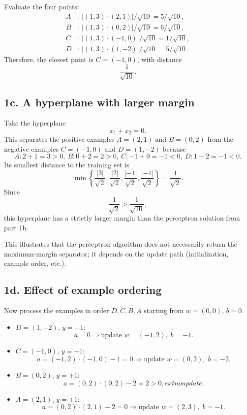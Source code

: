 \documentclass[11pt]{article}
\begin{document}
Evaluate the four points:
\[
\begin{aligned}
A &:~ |(1,3)\cdot(2,1)|/\sqrt{10} = 5/\sqrt{10},\\
B &:~ |(1,3)\cdot(0,2)|/\sqrt{10} = 6/\sqrt{10},\\
C &:~ |(1,3)\cdot(-1,0)|/\sqrt{10} = 1/\sqrt{10},\\
D &:~ |(1,3)\cdot(1,-2)|/\sqrt{10} = 5/\sqrt{10}.
\end{aligned}
\]
Therefore, the closest point is $C=(-1,0)$, with distance
\[
\boxed{\frac{1}{\sqrt{10}}.}
\]

\subsection*{1c. A hyperplane with larger margin}

Take the hyperplane
\[
x_1+x_2=0.
\]
This separates the positive examples $A=(2,1)$ and $B=(0,2)$ from the negative examples $C=(-1,0)$ and $D=(1,-2)$ because
\[
A: 2+1=3>0,\
B: 0+2=2>0,\
C: -1+0=-1<0,\
D: 1-2=-1<0.
\]
Its smallest distance to the training set is
\[
\min\left\{\frac{|3|}{\sqrt2},\frac{|2|}{\sqrt2},\frac{|-1|}{\sqrt2},\frac{|-1|}{\sqrt2}\right\} = \frac{1}{\sqrt2}.
\]
Since
\[
\frac{1}{\sqrt2} > \frac{1}{\sqrt{10}},
\]
this hyperplane has a strictly larger margin than the perceptron solution from part 1b.

This illustrates that the perceptron algorithm does not necessarily return the maximum-margin separator; it depends on the update path (initialization, example order, etc.).

\subsection*{1d. Effect of example ordering}

Now process the examples in order $D,C,B,A$ starting from $w=(0,0)$, $b=0$.

\begin{itemize}[leftmargin=1.5em]
  \item $D=(1,-2)$, $y=-1$:
  \[
  a=0 \Rightarrow \text{update } w=(-1,2),\; b=-1.
  \]

  \item $C=(-1,0)$, $y=-1$:
  \[
  a=(-1,2)\cdot(-1,0)-1=0 \Rightarrow \text{update } w=(0,2),\; b=-2.
  \]

  \item $B=(0,2)$, $y=+1$:
  \[
  a=(0,2)\cdot(0,2)-2=2>0,	ext{ no update.}
  \]

  \item $A=(2,1)$, $y=+1$:
  \[
  a=(0,2)\cdot(2,1)-2=0 \Rightarrow \text{update } w=(2,3),\; b=-1.
  \]
\end{itemize}
\end{document}
